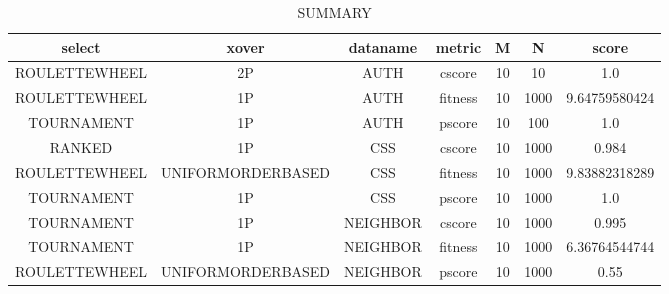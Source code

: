 \begin{table}[H]
	\centering
	\caption{SUMMARY}
	\begin{adjustbox}{width=1\textwidth}
		\begin{tabular}{ |c|c|c|c|c|c|c| }
			\hline
			select & xover & dataname & metric & M & N & score\\
			\hline
			\hline
			ROULETTEWHEEL & 2P & AUTH & cscore & 10 & 10 & 1.0\\
			\hline
			ROULETTEWHEEL & 1P & AUTH & fitness & 10 & 1000 & 9.64759580424\\
			\hline
			TOURNAMENT & 1P & AUTH & pscore & 10 & 100 & 1.0\\
			\hline
			RANKED & 1P & CSS & cscore & 10 & 1000 & 0.984\\
			\hline
			ROULETTEWHEEL & UNIFORMORDERBASED & CSS & fitness & 10 & 1000 & 9.83882318289\\
			\hline
			TOURNAMENT & 1P & CSS & pscore & 10 & 1000 & 1.0\\
			\hline
			TOURNAMENT & 1P & NEIGHBOR & cscore & 10 & 1000 & 0.995\\
			\hline
			TOURNAMENT & 1P & NEIGHBOR & fitness & 10 & 1000 & 6.36764544744\\
			\hline
			ROULETTEWHEEL & UNIFORMORDERBASED & NEIGHBOR & pscore & 10 & 1000 & 0.55\\
			\hline
		\end{tabular}
	\end{adjustbox}
\end{table}
